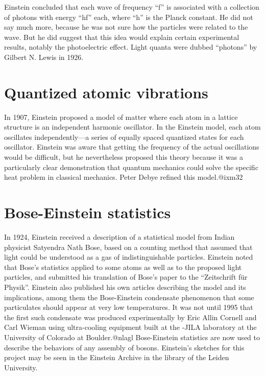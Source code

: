 \documentclass[twoside]{memoir}
\begin{document}
Einstein concluded that each wave of frequency \enquote{f} is associated with a collection of photons with energy \enquote{hf} each, where \enquote{h} is the Planck constant. He did not say much more, because he was not sure how the particles were related to the wave. But he did suggest that this idea would explain certain experimental results, notably the photoelectric effect. Light quanta were dubbed \enquote{photons} by Gilbert N. Lewis in 1926.
\section{Quantized atomic vibrations}
In 1907, Einstein proposed a model of matter where each atom in a lattice structure is an independent harmonic oscillator. In the Einstein model, each atom oscillates independently---a series of equally spaced quantized states for each oscillator. Einstein was aware that getting the frequency of the actual oscillations would be difficult, but he nevertheless proposed this theory because it was a particularly clear demonstration that quantum mechanics could solve the specific heat problem in classical mechanics. Peter Debye refined this model.@ixm32
\section{Bose-Einstein statistics}
In 1924, Einstein received a description of a statistical model from Indian physicist Satyendra Nath Bose, based on a counting method that assumed that light could be understood as a gas of indistinguishable particles. Einstein noted that Bose's statistics applied to some atoms as well as to the proposed light particles, and submitted his translation of Bose's paper to the \enquote{Zeitschrift für Physik}. Einstein also published his own articles describing the model and its implications, among them the Bose-Einstein condensate phenomenon that some particulates should appear at very low temperatures. It was not until 1995 that the first such condensate was produced experimentally by Eric Allin Cornell and Carl Wieman using ultra-cooling equipment built at the -JILA laboratory at the University of Colorado at Boulder.@nlagl Bose-Einstein statistics are now used to describe the behaviors of any assembly of bosons. Einstein's sketches for this project may be seen in the Einstein Archive in the library of the Leiden University.
\end{document}
